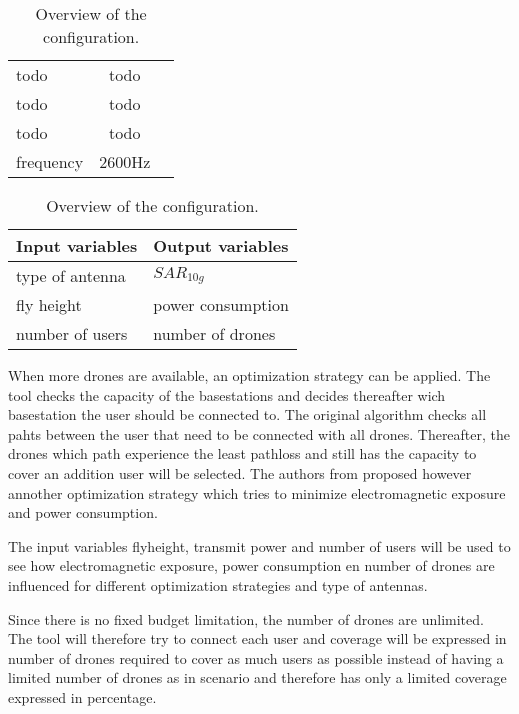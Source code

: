 \begin{table}[!htb]
    \begin{minipage}{.5\linewidth}
      \centering
        \begin{tabular}{|l|c|l|}
        \hline
        todo               & todo        \\    
        todo               & todo\\ 
        todo               & todo                     \\ 
        frequency                      & 2600Hz                   \\ 
        \hline
        \end{tabular}
    \end{minipage}%
    \begin{minipage}{.5\linewidth}
      \centering
            \begin{tabular}{|l|l|}
            \hline
            Input variables                & Output variables          \\   \hline 
            type of antenna                & $SAR_{10g}$               \\ 
            fly height                     & power consumption             \\ 
            number of users                & number of drones            \\ 
            \hline
            \end{tabular}
    \end{minipage} 
        \caption{Overview of the configuration.}
        \label{table:confOverviewScenario2}
\end{table}


When more drones are available, an optimization strategy can be applied. The tool checks the capacity of the basestations and decides thereafter
wich basestation the user should be connected to. The original algorithm checks all pahts between the user that need to be connected with 
all drones. Thereafter, the drones which path experience the least pathloss and still has the capacity to cover an addition user will be selected.
The authors from \cite{J1} proposed however annother optimization strategy which tries to minimize electromagnetic exposure and 
power consumption.

The input variables flyheight, transmit power and number of users will be used to see how electromagnetic exposure, power consumption en number of drones are influenced for
different optimization strategies and type of antennas.

Since there is no fixed budget limitation, the number of drones are unlimited. The tool will therefore try to connect each user and
coverage will be expressed in number of drones required to cover as much users as possible instead of having a limited number of drones  
as in scenario and therefore has only a limited coverage expressed in percentage.